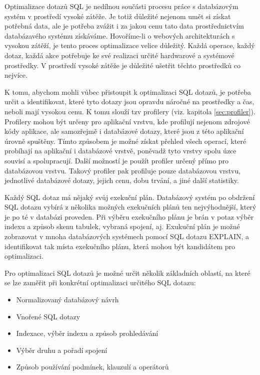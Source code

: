 \documentclass[12pt]{article}
\begin{document}
Optimalizace dotazů SQL je nedílnou součásti procesu práce s databázovým systém v prostředí vysoké zátěže. Je totiž důležité nejenom umět si získat potřebná data, ale je potřeba zvážit i za jakou cenu tato data prostřednictvím databázavého systému získáváme. Hovoříme-li o webových architekturách s vysokou zátěží, je tento proces optimalizace velice důležitý. Každá operace, každý dotaz, každá akce potřebuje ke své realizaci určité hardwarové a systémové prostředky. V prostředí vysoké zátěže je důležité ušetřit těchto prostředků co nejvíce.

K tomu, abychom mohli vůbec přistoupit k optimalizaci SQL dotazů, je potřeba určit a identifikovat, které tyto dotazy jsou opravdu náročné na prostředky a čas, neboli mají vysokou cenu. K tomu slouží tzv profilery (viz. kapitola \ref{sec:profiler}). Profilery mohou být určeny pro aplikační vrstvu, kde profilují nejenom zdrojové kódy aplikace, ale samozřejmě i databázové dotazy, které jsou z této aplikační úrovně spuštěny. Tímto způsobem je možné získat přehled všech operací, které probíhají na aplikační i databázové vrstvě, poněvadž tyto vrstvy spolu úzce souvisí a spolupracují. Další možností je použít profiler určený přímo pro databázovou vrstvu. Takový profiler pak profiluje pouze databázovou vrstvu, jednotlivé databázové dotazy, jejich cenu, dobu trvání, a jiné další statistiky.

Každý SQL dotaz má nějaký svůj exekuční plán. Databázový systém po obdržení SQL dotazu vybírá z několika možných exekučních plánů ten nejvýhodnější, který je po té v databázi proveden. Při výběru exekučního plánu je brán v potaz výběr indexu a způsob skenu tabulek, vybraná spojení, aj. Exukuční plán je možné zobrazovat v mnoha databázových systémech pomocí SQL dotazu EXPLAIN, a identifikovat tak místa exekučního plánu, která mohou být kandidátem pro optimalizaci.\cite{optimalizace-sql}

Pro optimalizaci SQL dotazů je možné určit několik základních oblastí, na které se lze zaměřit při konkrétní optimalizaci určitého SQL dotazu:

\begin{itemize}
\item Normalizovaný databázový návrh
\item Vnořené SQL dotazy
\item Indexace, výběr indexu a způsob prohledávání
\item Výběr druhu a pořadí spojení
\item Způsob používání podmínek, klauzulí a operátorů
\end{itemize}
\end{document}
